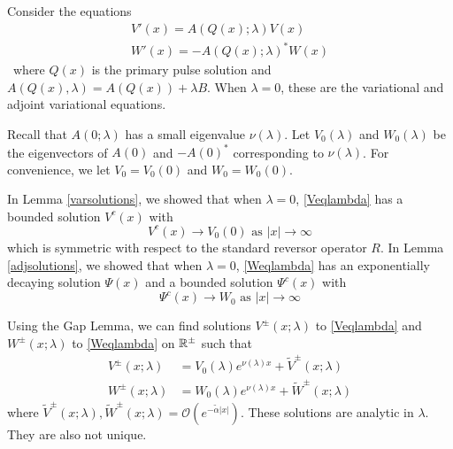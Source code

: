 \documentclass[thesis.tex]{subfiles}
\begin{document}
Consider the equations
\begin{align}
V'(x) = A(Q(x); \lambda) V(x) \label{Veqlambda} \\
W'(x) = -A(Q(x); \lambda)^* W(x) \label{Weqlambda}
\end{align}\
where $Q(x)$ is the primary pulse solution and $A(Q(x), \lambda) = A(Q(x)) + \lambda B$. When $\lambda = 0$, these are the variational and adjoint variational equations.

Recall that $A(0; \lambda)$ has a small eigenvalue $\nu(\lambda)$. Let $V_0(\lambda)$ and $W_0(\lambda)$ be the eigenvectors of $A(0)$ and $-A(0)^*$ corresponding to $\nu(\lambda)$. For convenience, we let $V_0 = V_0(0)$ and $W_0 = W_0(0)$.

In Lemma \ref{varsolutions}, we showed that when $\lambda = 0$, \eqref{Veqlambda} has a bounded solution $V^c(x)$ with
\[
V^c(x) \rightarrow V_0(0) \text{ as }|x| \rightarrow \infty
\]
which is symmetric with respect to the standard reversor operator $R$. In Lemma \ref{adjsolutions}, we showed that when $\lambda = 0$, \eqref{Weqlambda} has an exponentially decaying solution $\Psi(x)$ and a bounded solution $\Psi^c(x)$ with 
\[
\Psi^c(x) \rightarrow W_0 \text{ as }|x| \rightarrow \infty
\]

Using the Gap Lemma, we can find solutions $V^\pm(x; \lambda)$ to \eqref{Veqlambda} and $W^\pm(x; \lambda)$ to \eqref{Weqlambda} on ${\mathbb R}^\pm$ such that
\begin{align*}
V^\pm(x; \lambda) &= V_0(\lambda)e^{\nu(\lambda)x} + \tilde{V}^\pm(x; \lambda) \\
W^\pm(x; \lambda) &= W_0(\lambda)e^{\nu(\lambda)x} + \tilde{W}^\pm(x; \lambda)
\end{align*}
where $\tilde{V}^\pm(x; \lambda), \tilde{W}^\pm(x; \lambda) = \mathcal{O}(e^{-\tilde{\alpha}|x|})$. These solutions are analytic in $\lambda$. They are also not unique.
\end{document}
